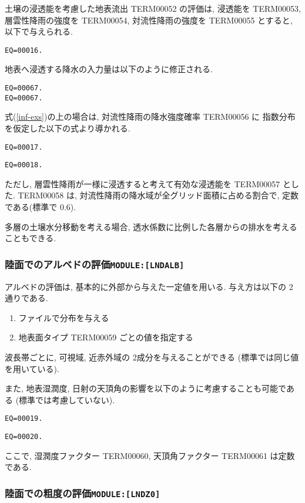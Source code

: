 土壌の浸透能を考慮した地表流出 TERM00052 の評価は, 浸透能を TERM00053, 
層雲性降雨の強度を TERM00054, 対流性降雨の強度を TERM00055 とすると, 
以下で与えられる. 
\begin{verbatim}
EQ=00016.
\end{verbatim}
地表へ浸透する降水の入力量は以下のように修正される. 
\begin{verbatim}
EQ=00067.
EQ=00067.
\end{verbatim}
式(\ref{inf-exs})の上の場合は, 対流性降雨の降水強度確率 TERM00056 に
指数分布を仮定した以下の式より導かれる. 
\begin{verbatim}
EQ=00017.
\end{verbatim}
\begin{verbatim}
EQ=00018.
\end{verbatim}
ただし, 層雲性降雨が一様に浸透すると考えて有効な浸透能を
TERM00057 とした. 
TERM00058 は, 対流性降雨の降水域が全グリッド面積に占める割合で, 
定数である(標準で 0.6). 

多層の土壌水分移動を考える場合, 
透水係数に比例した各層からの排水を考えることもできる. 

\subsubsection{陸面でのアルベドの評価\texttt{MODULE:[LNDALB]}}

アルベドの評価は, 基本的に外部から与えた一定値を用いる. 
与え方は以下の 2通りである. 
\begin{enumerate}
    \item ファイルで分布を与える
    \item 地表面タイプ TERM00059 ごとの値を指定する
\end{enumerate}

波長帯ごとに, 可視域, 近赤外域の 2成分を与えることができる
(標準では同じ値を用いている). 

また, 地表湿潤度, 日射の天頂角の影響を以下のように考慮することも可能である
(標準では考慮していない). 
\begin{verbatim}
EQ=00019.
\end{verbatim}
\begin{verbatim}
EQ=00020.
\end{verbatim}
ここで, 湿潤度ファクター TERM00060, 天頂角ファクター TERM00061 は定数である. 

\subsubsection{陸面での粗度の評価\texttt{MODULE:[LNDZ0]}}

